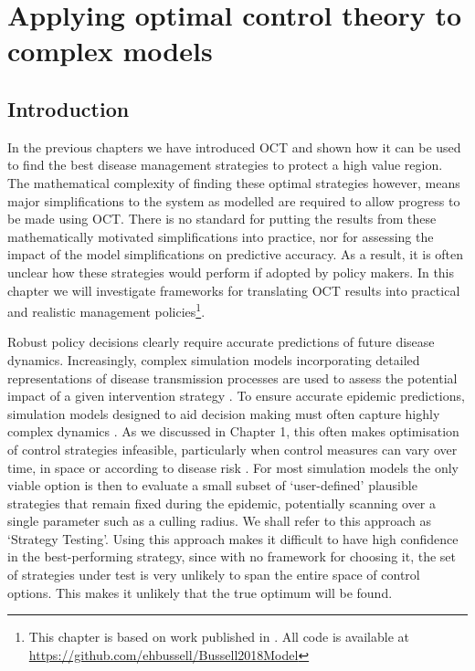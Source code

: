 %
\chapter{Applying optimal control theory to complex models\label{ch:complex_models}}

\section{Introduction\label{sec:ch4:Intro}}

In the previous chapters we have introduced OCT and shown how it can be used to find the best disease management strategies to protect a high value region. The mathematical complexity of finding these optimal strategies however, means major simplifications to the system as modelled are required to allow progress to be made using OCT\@. There is no standard for putting the results from these mathematically motivated simplifications into practice, nor for assessing the impact of the model simplifications on predictive accuracy. As a result, it is often unclear how these strategies would perform if adopted by policy makers. In this chapter we will investigate frameworks for translating OCT results into practical and realistic management policies\footnote{This chapter is based on work published in \citet{bussell_applying_2019}. All code is available at \url{https://github.com/ehbussell/Bussell2018Model}}.

Robust policy decisions clearly require accurate predictions of future disease dynamics. Increasingly, complex simulation models incorporating detailed representations of disease transmission processes are used to assess the potential impact of a given intervention strategy \citep{lofgren_opinion_2014}. To ensure accurate epidemic predictions, simulation models designed to aid decision making must often capture highly complex dynamics \citep[Chapter 1,][]{savary_simulation_2014}. As we discussed in Chapter 1, this often makes optimisation of control strategies infeasible, particularly when control measures can vary over time, in space or according to disease risk \citep{bellman_dynamic_1957}. For most simulation models the only viable option is then to evaluate a small subset of `user-defined' plausible strategies that remain fixed during the epidemic, potentially scanning over a single parameter such as a culling radius. We shall refer to this approach as `Strategy Testing'. Using this approach makes it difficult to have high confidence in the best-performing strategy, since with no framework for choosing it, the set of strategies under test is very unlikely to span the entire space of control options. This makes it unlikely that the true optimum will be found.

